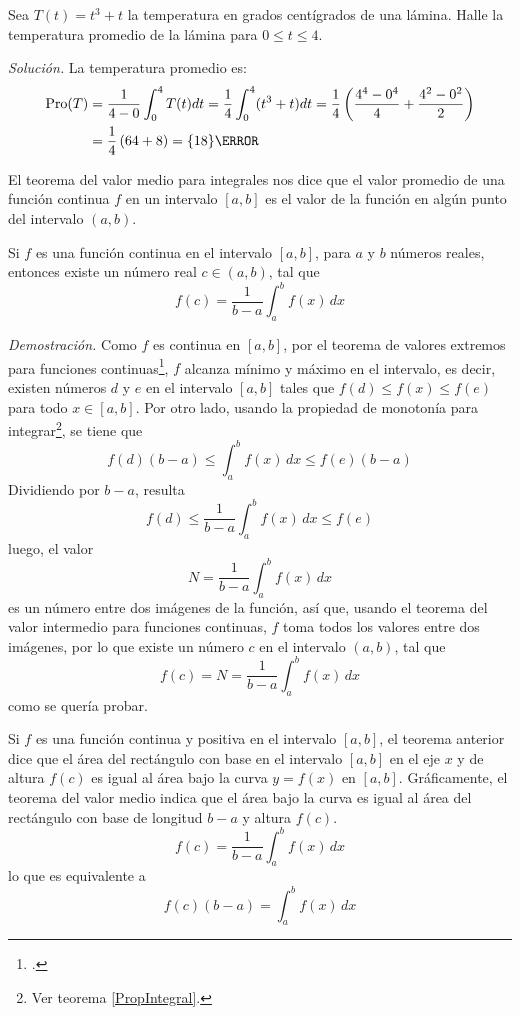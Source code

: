 \begin{ejemplo}
Sea $T(t) =t^{3}+t$ la temperatura en grados centígrados de una lámina. Halle la temperatura promedio de la lámina para $0\leq t\leq 4$.
\end{ejemplo}

\emph{Solución.}
La temperatura promedio es:
\begin{gather*}
\begin{aligned}
  \Pro(T)&=\frac{1}{4-0}\int_{0}^{4}T(t)dt %
  =\frac{1}{4}\int_{0}^{4}(t^{3}+t)dt=\frac{1}{4}\left( \frac{4^{4}-0^{4}}{4}+\frac{4^{2}-0^{2}}{2}\right) \\
  &=\frac{1}{4}\left(64+8\right)=\qty{18}{\degreeCelsius}
\end{aligned}
\end{gather*}

El teorema del valor medio para integrales nos dice que el valor promedio de una función continua $f$ en un intervalo $[a,b]$ es el valor de la función en algún punto del intervalo $(a,b)$.
\begin{teorema}\label{ValorMedio}
Si $f$ es una función continua en el intervalo $\left[a,b\right]$, para $a$ y $b$ números reales, entonces existe un número real $c\in \left( a,b\right)$, tal que
\begin{equation}
  f\left( c\right) =\frac{1}{b-a}\int_{a}^{b}f(x)\,dx
\end{equation}

\end{teorema}
\textit{Demostración.} Como $f$ es continua en $[a,b]$, por el teorema de valores extremos para funciones continuas\footnote{\textcite{Stewart_2012}.}, $f$ alcanza mínimo y máximo en el intervalo, es decir, existen números $d$ y $e$ en el intervalo $[a,b]$ tales que $f\left(d\right) \leq f(x)\leq f(e)$ para todo $x\in[a,b]$. Por otro lado, usando la propiedad de monotonía para integrar\footnote{Ver teorema \ref{PropIntegral}.}, se tiene que
\[
f(d)(b-a)\leq \int_{a}^{b}f(x)\,dx\leq f(e)(b-a)
\]
Dividiendo por $b-a$, resulta
\[
f\left( d\right) \leq \frac{1}{b-a}\int_{a}^{b}f(x)\,dx\leq f(e)
\]
luego, el valor
\[
N=\frac{1}{b-a}\int_{a}^{b}f(x)\,dx
\]
es un número entre dos imágenes de la función, así que, usando el teorema del valor intermedio para funciones continuas, $f$ toma todos los valores entre dos imágenes, por lo que existe un número $c$ en el intervalo $\left( a,b\right)$, tal que
\[
f(c)=N=\frac{1}{b-a}\int_{a}^{b}f(x)\,dx
\]
como se quería probar.

Si $f$ es una función continua y positiva en el intervalo $\left[a,b\right] $, el teorema anterior dice que el área del rectángulo con base en el intervalo $[a,b] $ en el eje $x$ y de altura $
f\left( c\right) $ es igual al área bajo la curva $y=f(x) $ en $[a,b] .$ Gráficamente, el teorema del valor medio indica que el área bajo la curva es igual al área del rectángulo con base de longitud $b-a$ y altura $f\left( c\right)$.
\[
f\left( c\right) =\frac{1}{b-a}\int_{a}^{b}f(x)\,dx
\]
lo que es equivalente a
\[
f\left( c\right) \left( b-a\right) =\int_{a}^{b}f(x)\,dx
\]

